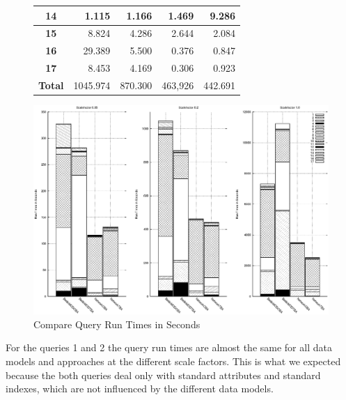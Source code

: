 \documentclass[a4paper]{article}
\begin{document}
{\begin{figure}[h]
\begin{minipage}{0.5\linewidth}
\begin{tiny}
\begin{tabular}{|c|r|r|r|r|}
        \hline
        \textbf{14}&1.115&1.166&1.469&9.286\\
        \hline
        \textbf{15}&8.824&4.286&2.644&2.084\\
        \hline
        \textbf{16}&29.389&5.500&0.376&0.847\\
        \hline
        \textbf{17}&8.453&4.169&0.306&0.923\\
        \hline
        \textbf{Total}&1045.974&870.300&463,926&442.691\\
        \hline
      \end{tabular}
    \end{tiny}
  \end{minipage}\hfill
  \begin{minipage}{0.5\textwidth}
      \includegraphics[width=1.0\linewidth]{compruntimesall.eps}
  \end{minipage}
 \caption{Compare Query Run Times in Seconds}
 \label{fig:compruntimes}
\end{figure}
For the queries 1 and 2 the query run times are almost the same for all data models
and approaches at the different scale factors. This is what we expected because
the both queries deal only with standard attributes and standard indexes, which
are not influenced by the different data models.

}
\end{document}
